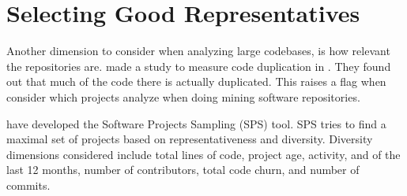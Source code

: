 \documentclass{usiinfdocprop}
\begin{document}
\section{Selecting Good Representatives \label{org45b0cc4}}
\label{sec:org9939386}
Another dimension to consider when analyzing large codebases, is how relevant the repositories are.
\cite{lopes_dejavu:_2017} made a study to measure code duplication in \github{}.
They found out that much of the code there is actually duplicated.
This raises a flag when consider which projects analyze when doing mining software repositories. 

\cite{nagappan_diversity_2013} have developed the Software Projects Sampling (SPS) tool.
SPS tries to find a maximal set of projects based on representativeness and diversity.
Diversity dimensions considered include total lines of code, project age, activity, and of the last 12 months, number of contributors, total code churn, and number of commits.



\end{document}
